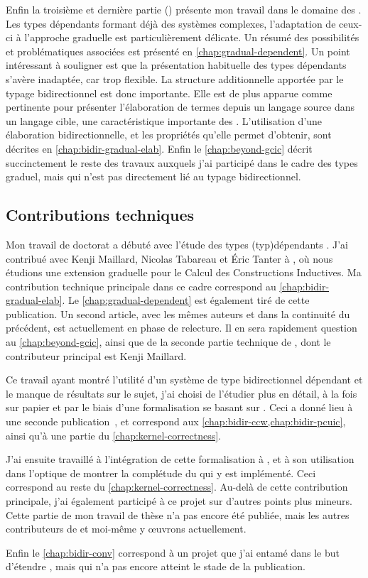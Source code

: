 Enfin la troisième et dernière partie ()
présente mon travail dans le domaine des .
Les types dépendants formant déjà des systèmes
complexes, l’adaptation de ceux-ci à l’approche graduelle est particulièrement
délicate. Un résumé des possibilités et problématiques associées est présenté
en \cref{chap:gradual-dependent}.
Un point intéressant à souligner est que la présentation habituelle
des types dépendants s’avère inadaptée, car trop flexible.
La structure additionnelle apportée par le typage bidirectionnel est donc importante.
Elle est de plus apparue comme pertinente pour présenter
l’élaboration de termes depuis un langage source dans un langage cible, une
caractéristique importante des .
L’utilisation d’une élaboration bidirectionnelle, et les propriétés qu’elle
permet d’obtenir, sont décrites en \cref{chap:bidir-gradual-elab}.
Enfin le \cref{chap:beyond-gcic} décrit succinctement le reste des travaux auxquels
j’ai participé dans le cadre des types graduel, mais qui n’est pas directement lié
au typage bidirectionnel.

\subsection{Contributions techniques}

Mon travail de doctorat a débuté avec l’étude des types \kl(typ){dépendants} .
J’ai contribué avec Kenji Maillard, Nicolas Tabareau et Éric Tanter à
, où nous étudions une extension graduelle
pour le Calcul des Constructions Inductives. Ma contribution technique principale
dans ce cadre correspond au \cref{chap:bidir-gradual-elab}.
Le \cref{chap:gradual-dependent} est également tiré de cette publication.
Un second article, avec les mêmes auteurs et dans la continuité du précédent,
est actuellement en phase de relecture. Il en sera rapidement question au
\cref{chap:beyond-gcic}, ainsi que de la seconde partie technique de
\textcite{LennonBertrand2022}, dont le contributeur principal est Kenji Maillard.

Ce travail ayant montré l’utilité d’un système de type bidirectionnel dépendant
et le manque de résultats sur le sujet, j’ai choisi de l’étudier
plus en détail, à la fois sur papier et par le biais d’une
formalisation se basant sur .
Ceci a donné lieu à une seconde publication~,
et correspond aux \cref{chap:bidir-ccw,chap:bidir-pcuic}, ainsi qu’à une partie du
\cref{chap:kernel-correctness}.

J’ai ensuite travaillé à l’intégration de cette formalisation à
, et à son utilisation dans l’optique de montrer la complétude du 
qui y est implémenté. Ceci correspond au reste du \cref{chap:kernel-correctness}.
Au-delà de cette contribution principale,
j’ai également participé à ce projet sur d’autres points plus mineurs.
Cette partie de mon travail de thèse n’a pas encore été publiée, mais
les autres contributeurs de  et moi-même y œuvrons actuellement.

Enfin le \cref{chap:bidir-conv} correspond à un projet que j’ai entamé dans
le but d’étendre , mais qui n’a pas encore atteint le stade de la
publication.